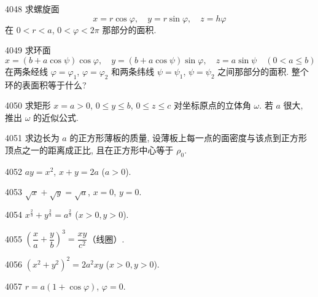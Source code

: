 \begin{prob}[M]{4048}
求螺旋面
\[
x = r\cos\varphi, \quad y = r\sin\varphi, \quad z = h\varphi
\]
在 $0 < r < a$, $0 < \varphi < 2\pi$ 那部分的面积.
\end{prob}

\begin{prob}[L]{4049}
求环面
\[
x = (b + a\cos\psi)\cos\varphi, \quad y = (b + a\cos\psi)\sin\varphi, \quad z = a\sin\psi \quad (0 < a \leqslant b)
\]
在两条经线 $\varphi = \varphi_1$, $\varphi = \varphi_2$ 和两条纬线 $\psi = \psi_1$, $\psi = \psi_2$ 之间那部分的面积. 整个环的表面积等于什么?
\end{prob}

\begin{prob}[M]{4050}
求矩形 $x = a > 0$, $0 \leqslant y \leqslant b$, $0 \leqslant z \leqslant c$ 对坐标原点的立体角 $\omega$. 若 $a$ 很大, 推出 $\omega$ 的近似公式.
\end{prob}


\begin{prob}[M]{4051}
求边长为 $a$ 的正方形薄板的质量, 设薄板上每一点的面密度与该点到正方形顶点之一的距离成正比, 且在正方形中心等于 $\rho_0$.
\end{prob}


\begin{prob}[S]{4052}
$ay = x^2$, $x + y = 2a$ ($a > 0$).
\end{prob}

\begin{prob}[S]{4053}
$\sqrt{x} + \sqrt{y} = \sqrt{a}$, $x = 0$, $y = 0$.
\end{prob}

\begin{prob}[S]{4054}
$x^{\frac{2}{3}} + y^{\frac{2}{3}} = a^{\frac{2}{3}}$ ($x > 0, y > 0$).
\end{prob}

\begin{prob}[S]{4055}
$\left(\dfrac{x}{a} + \dfrac{y}{b}\right)^3 = \dfrac{xy}{c^2}$（线圈）.
\end{prob}

\begin{prob}[S]{4056}
$(x^2 + y^2)^2 = 2a^2 xy$ ($x > 0, y > 0$).
\end{prob}

\begin{prob}[S]{4057}
$r = a(1 + \cos\varphi)$, $\varphi = 0$.
\end{prob}


